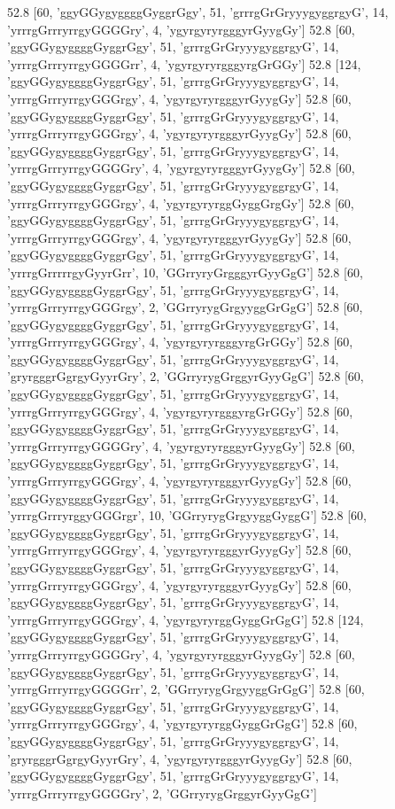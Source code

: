 52.8 [60, 'ggyGGygyggggGyggrGgy', 51, 'grrrgGrGryyygyggrgyG', 14, 'yrrrgGrrryrrgyGGGGry', 4, 'ygyrgyryrgggyrGyygGy']
52.8 [60, 'ggyGGygyggggGyggrGgy', 51, 'grrrgGrGryyygyggrgyG', 14, 'yrrrgGrrryrrgyGGGGrr', 4, 'ygyrgyryrgggyrgGrGGy']
52.8 [124, 'ggyGGygyggggGyggrGgy', 51, 'grrrgGrGryyygyggrgyG', 14, 'yrrrgGrrryrrgyGGGrgy', 4, 'ygyrgyryrgggyrGyygGy']
52.8 [60, 'ggyGGygyggggGyggrGgy', 51, 'grrrgGrGryyygyggrgyG', 14, 'yrrrgGrrryrrgyGGGrgy', 4, 'ygyrgyryrgggyrGyygGy']
52.8 [60, 'ggyGGygyggggGyggrGgy', 51, 'grrrgGrGryyygyggrgyG', 14, 'yrrrgGrrryrrgyGGGGry', 4, 'ygyrgyryrgggyrGyygGy']
52.8 [60, 'ggyGGygyggggGyggrGgy', 51, 'grrrgGrGryyygyggrgyG', 14, 'yrrrgGrrryrrgyGGGrgy', 4, 'ygyrgyryrggGyggGrgGy']
52.8 [60, 'ggyGGygyggggGyggrGgy', 51, 'grrrgGrGryyygyggrgyG', 14, 'yrrrgGrrryrrgyGGGrgy', 4, 'ygyrgyryrgggyrGyygGy']
52.8 [60, 'ggyGGygyggggGyggrGgy', 51, 'grrrgGrGryyygyggrgyG', 14, 'yrrrgGrrrrrgyGyyrGrr', 10, 'GGrryryGrgggyrGyyGgG']
52.8 [60, 'ggyGGygyggggGyggrGgy', 51, 'grrrgGrGryyygyggrgyG', 14, 'yrrrgGrrryrrgyGGGrgy', 2, 'GGrryrygGrgyyggGrGgG']
52.8 [60, 'ggyGGygyggggGyggrGgy', 51, 'grrrgGrGryyygyggrgyG', 14, 'yrrrgGrrryrrgyGGGrgy', 4, 'ygyrgyryrgggyrgGrGGy']
52.8 [60, 'ggyGGygyggggGyggrGgy', 51, 'grrrgGrGryyygyggrgyG', 14, 'gryrgggrGgrgyGyyrGry', 2, 'GGrryrygGrggyrGyyGgG']
52.8 [60, 'ggyGGygyggggGyggrGgy', 51, 'grrrgGrGryyygyggrgyG', 14, 'yrrrgGrrryrrgyGGGrgy', 4, 'ygyrgyryrgggyrgGrGGy']
52.8 [60, 'ggyGGygyggggGyggrGgy', 51, 'grrrgGrGryyygyggrgyG', 14, 'yrrrgGrrryrrgyGGGGry', 4, 'ygyrgyryrgggyrGyygGy']
52.8 [60, 'ggyGGygyggggGyggrGgy', 51, 'grrrgGrGryyygyggrgyG', 14, 'yrrrgGrrryrrgyGGGrgy', 4, 'ygyrgyryrgggyrGyygGy']
52.8 [60, 'ggyGGygyggggGyggrGgy', 51, 'grrrgGrGryyygyggrgyG', 14, 'yrrrgGrrryrggyGGGrgr', 10, 'GGrryrygGrgyyggGyggG']
52.8 [60, 'ggyGGygyggggGyggrGgy', 51, 'grrrgGrGryyygyggrgyG', 14, 'yrrrgGrrryrrgyGGGrgy', 4, 'ygyrgyryrgggyrGyygGy']
52.8 [60, 'ggyGGygyggggGyggrGgy', 51, 'grrrgGrGryyygyggrgyG', 14, 'yrrrgGrrryrrgyGGGrgy', 4, 'ygyrgyryrgggyrGyygGy']
52.8 [60, 'ggyGGygyggggGyggrGgy', 51, 'grrrgGrGryyygyggrgyG', 14, 'yrrrgGrrryrrgyGGGrgy', 4, 'ygyrgyryrggGyggGrGgG']
52.8 [124, 'ggyGGygyggggGyggrGgy', 51, 'grrrgGrGryyygyggrgyG', 14, 'yrrrgGrrryrrgyGGGGry', 4, 'ygyrgyryrgggyrGyygGy']
52.8 [60, 'ggyGGygyggggGyggrGgy', 51, 'grrrgGrGryyygyggrgyG', 14, 'yrrrgGrrryrrgyGGGGrr', 2, 'GGrryrygGrgyyggGrGgG']
52.8 [60, 'ggyGGygyggggGyggrGgy', 51, 'grrrgGrGryyygyggrgyG', 14, 'yrrrgGrrryrrgyGGGrgy', 4, 'ygyrgyryrggGyggGrGgG']
52.8 [60, 'ggyGGygyggggGyggrGgy', 51, 'grrrgGrGryyygyggrgyG', 14, 'gryrgggrGgrgyGyyrGry', 4, 'ygyrgyryrgggyrGyygGy']
52.8 [60, 'ggyGGygyggggGyggrGgy', 51, 'grrrgGrGryyygyggrgyG', 14, 'yrrrgGrrryrrgyGGGGry', 2, 'GGrryrygGrggyrGyyGgG']

